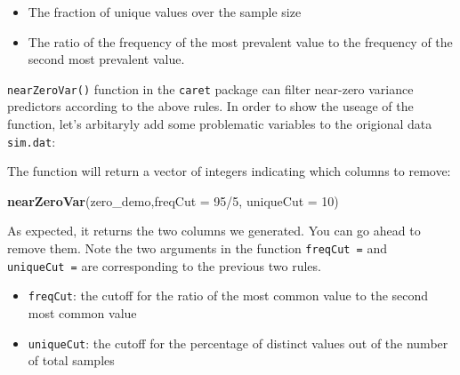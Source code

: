 \documentclass[]{book}
\newenvironment{Shaded}{\begin{snugshade}}{\end{snugshade}}
\newcommand{\KeywordTok}[1]{\textcolor[rgb]{0.13,0.29,0.53}{\textbf{{#1}}}}
\newcommand{\DataTypeTok}[1]{\textcolor[rgb]{0.13,0.29,0.53}{{#1}}}
\newcommand{\DecValTok}[1]{\textcolor[rgb]{0.00,0.00,0.81}{{#1}}}
\newcommand{\CommentTok}[1]{\textcolor[rgb]{0.56,0.35,0.01}{\textit{{#1}}}}
\newcommand{\NormalTok}[1]{{#1}}
\providecommand{\tightlist}{%
  \setlength{\itemsep}{0pt}\setlength{\parskip}{0pt}}
\theoremstyle{definition}
\theoremstyle{definition}
\theoremstyle{remark}
\begin{document}
\begin{itemize}
\tightlist
\item
  The fraction of unique values over the sample size
\item
  The ratio of the frequency of the most prevalent value to the
  frequency of the second most prevalent value.
\end{itemize}

\texttt{nearZeroVar()} function in the \texttt{caret} package can filter
near-zero variance predictors according to the above rules. In order to
show the useage of the function, let's arbitaryly add some problematic
variables to the origional data \texttt{sim.dat}:

\begin{Shaded}
\end{Shaded}

The function will return a vector of integers indicating which columns
to remove:

\begin{Shaded}
\begin{Highlighting}[]
\KeywordTok{nearZeroVar}\NormalTok{(zero_demo,}\DataTypeTok{freqCut =} \DecValTok{95}\NormalTok{/}\DecValTok{5}\NormalTok{, }\DataTypeTok{uniqueCut =} \DecValTok{10}\NormalTok{)}
\end{Highlighting}
\end{Shaded}

As expected, it returns the two columns we generated. You can go ahead
to remove them. Note the two arguments in the function
\texttt{freqCut\ =} and \texttt{uniqueCut\ =} are corresponding to the
previous two rules.

\begin{itemize}
\tightlist
\item
  \texttt{freqCut}: the cutoff for the ratio of the most common value to
  the second most common value
\item
  \texttt{uniqueCut}: the cutoff for the percentage of distinct values
  out of the number of total samples
\end{itemize}
\end{document}
